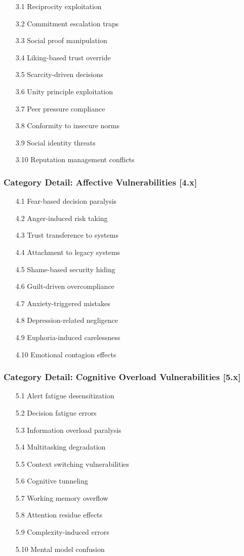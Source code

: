 \documentclass[11pt,a4paper]{article}
\begin{document}
\begin{enumerate}
\item[3.1] Reciprocity exploitation
\item[3.2] Commitment escalation traps
\item[3.3] Social proof manipulation
\item[3.4] Liking-based trust override
\item[3.5] Scarcity-driven decisions
\item[3.6] Unity principle exploitation
\item[3.7] Peer pressure compliance
\item[3.8] Conformity to insecure norms
\item[3.9] Social identity threats
\item[3.10] Reputation management conflicts
\end{enumerate}

\subsubsection{Category Detail: Affective Vulnerabilities [4.x]}

\begin{enumerate}
\item[4.1] Fear-based decision paralysis
\item[4.2] Anger-induced risk taking
\item[4.3] Trust transference to systems
\item[4.4] Attachment to legacy systems
\item[4.5] Shame-based security hiding
\item[4.6] Guilt-driven overcompliance
\item[4.7] Anxiety-triggered mistakes
\item[4.8] Depression-related negligence
\item[4.9] Euphoria-induced carelessness
\item[4.10] Emotional contagion effects
\end{enumerate}

\subsubsection{Category Detail: Cognitive Overload Vulnerabilities [5.x]}

\begin{enumerate}
\item[5.1] Alert fatigue desensitization
\item[5.2] Decision fatigue errors
\item[5.3] Information overload paralysis
\item[5.4] Multitasking degradation
\item[5.5] Context switching vulnerabilities
\item[5.6] Cognitive tunneling
\item[5.7] Working memory overflow
\item[5.8] Attention residue effects
\item[5.9] Complexity-induced errors
\item[5.10] Mental model confusion
\end{enumerate}
\end{document}
